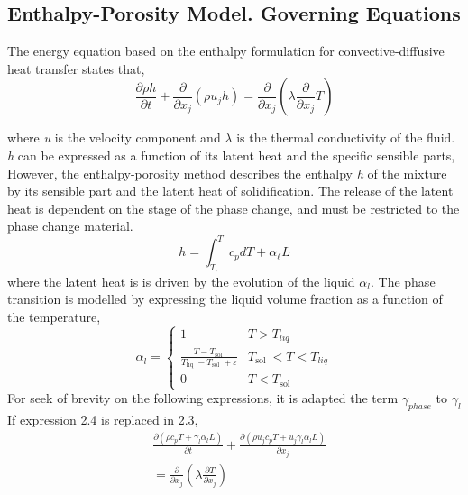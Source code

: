 \subsection{Enthalpy-Porosity Model. Governing Equations}
The energy equation based on the enthalpy formulation for convective-diffusive heat transfer states that,
\begin{equation}
	\frac{\partial \rho h}{\partial t}+\frac{\partial}{\partial x_{j}}\left(\rho u_{j} h\right)=\frac{\partial}{\partial x_{j}}\left(\lambda \frac{\partial}{\partial x_{j}} T\right)
	\label{2.3}
\end{equation}

where \textit{u} is the velocity component and $\lambda$ is the thermal conductivity of the fluid. \textit{h} can be expressed as a function of its latent heat and the specific sensible parts,
\newline
However, the enthalpy-porosity method describes the enthalpy \textit{h} of the mixture by its sensible part and the latent heat of solidification.
The release of the latent heat is dependent on the stage of the phase change, and must be restricted to the phase change material.
\begin{equation}
	h=\int_{T_{r}}^{T} c_{p} d T+\alpha_{\ell} L
	\label{2.4}
\end{equation}
where the latent heat is is driven by the evolution of the liquid $\alpha_{l}$. The phase transition is modelled by expressing the liquid volume fraction as a function of the temperature,
\begin{equation}
	\alpha_{l}= \begin{cases}
		1 & T>T_{l i q} \\ \frac{T-T_{\text {sol }}}{T_{\text {liq }}-T_{\text {sol }}+\varepsilon} & T_{\text {sol }}<T<T_{l i q} \\ 0 & T<T_{\text {sol }}
	\end{cases}
	\label{2.5}
\end{equation}
For seek of brevity on the following expressions, it is adapted the term $\gamma_{phase}$ to $\gamma_{l}$ 
If expression 2.4 is replaced in 2.3,
\begin{equation}
	\begin{aligned}
		&\frac{\partial\left(\rho c_{p} T + \gamma_{l} \alpha_{l} L\right)}{\partial t}+\frac{\partial\left(\rho u_{j} c_{p} T + u_{j}\gamma_{l} \alpha_{l} L\right)}{\partial x_{j}} \\
		&=\frac{\partial}{\partial x_{j}}\left(\lambda \frac{\partial T}{\partial x_{j}}\right) 
	\end{aligned}
	\label{2.6}
\end{equation}
